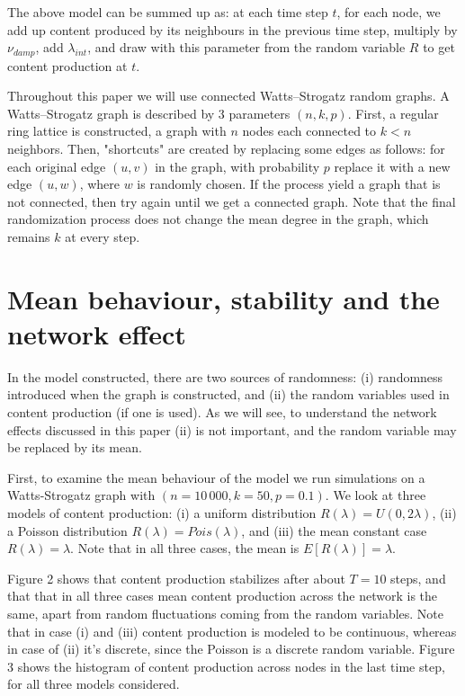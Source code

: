 \documentclass[final,5p,times,twocolumn,authoryear]{elsarticle}
\begin{document}
The above model can be summed up as: at each time step $t$, for each node, we add up content produced by its neighbours in the previous time step, multiply by $\nu_{damp} $, add $\lambda_{int}$, and draw with this parameter from the random variable $R$ to get content production at $t$.

Throughout this paper we will use connected Watts–Strogatz random graphs. A Watts–Strogatz graph is described by 3 parameters $(n, k, p)$. First, a regular ring lattice is constructed, a graph with $n$ nodes each connected to $k < n$ neighbors. Then, "shortcuts" are created by replacing some edges as follows: for each original edge $(u, v)$ in the graph, with probability $p$ replace it with a new edge $(u, w)$, where $w$ is randomly chosen. If the process yield a graph that is not connected, then try again until we get a connected graph. Note that the final randomization process does not change the mean degree in the graph, which remains $k$ at every step.

\section{Mean behaviour, stability and the network effect}

In the model constructed, there are two sources of randomness: (i) randomness introduced when the graph is constructed, and (ii) the random variables used in content production (if one is used). As we will see, to understand the network effects discussed in this paper (ii) is not important, and the random variable may be replaced by its mean.

First, to examine the mean behaviour of the model we run simulations on a Watts-Strogatz graph with $(n=10\,000, k=50, p=0.1)$. We look at three models of content production: (i) a uniform distribution $R(\lambda)=U(0, 2 \lambda)$, (ii) a Poisson distribution $R(\lambda)=Pois(\lambda)$, and (iii) the mean constant case $R(\lambda)=\lambda$. Note that in all three cases, the mean is $E[R(\lambda)]=\lambda$.

Figure 2 shows that content production stabilizes after about $T=10$ steps, and that that in all three cases mean content production across the network is the same, apart from random fluctuations coming from the random variables. Note that in case (i) and (iii) content production is modeled to be continuous, whereas in case of (ii) it's discrete, since the Poisson is a discrete random variable. Figure 3 shows the histogram of content production across nodes in the last time step, for all three models considered.
\end{document}
